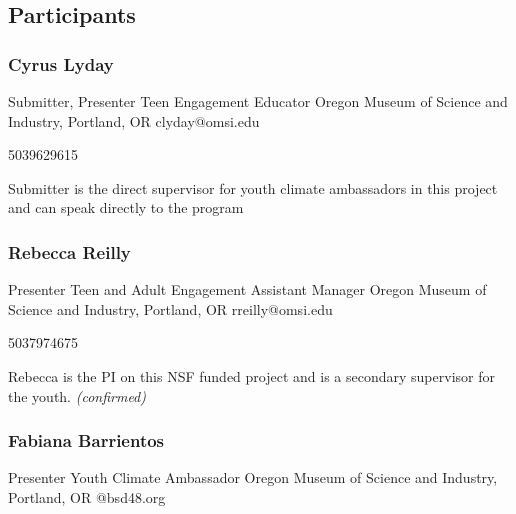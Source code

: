 \documentclass{report}
\begin{document}
            \subsection*{Participants}
              \subsubsection*{ Cyrus Lyday }
              Submitter, Presenter\newline
              Teen Engagement Educator\newline
              Oregon Museum of Science and Industry, Portland, OR
              \newline
              clyday@omsi.edu\newline
              
              5039629615\newline

              Submitter is the direct supervisor for youth climate ambassadors in this project and can speak directly to the program\newline


              

              
                \subsubsection*{ Rebecca Reilly }
                Presenter\newline
                Teen and Adult Engagement Assistant Manager\newline
                Oregon Museum of Science and Industry, Portland, OR
                \newline
                rreilly@omsi.edu\newline
                
                5037974675\newline

                Rebecca is the PI on this NSF funded project and is a secondary supervisor for the youth.
                \emph{ (confirmed) }
              

              
                \subsubsection*{ Fabiana Barrientos }
                Presenter\newline
                Youth Climate Ambassador\newline
                Oregon Museum of Science and Industry, Portland, OR
                @bsd48.org\newline
                
\end{document}
